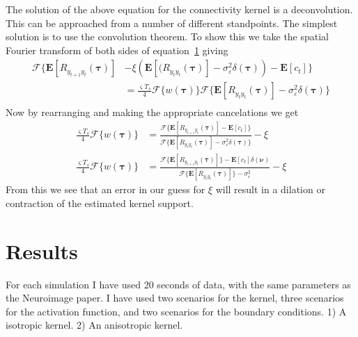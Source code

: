 \documentclass[conference]{IEEEtran}
\begin{document}
The solution of the above equation for the connectivity kernel is a deconvolution. This can be approached from a number of different standpoints. The simplest solution is to use the convolution theorem. To show this we take the spatial Fourier transform of both sides of equation~\ref{} giving
\begin{align}
	\mathcal{F}\{\mathbf{E}[R_{y_{t+1}y_t}(\boldsymbol{\tau})] &- \xi\left(\mathbf{E}[ (R_{y_ty_t}(\boldsymbol{\tau})] - \sigma_{\varepsilon}^2 \delta(\boldsymbol{\tau})\right) - \mathbf{E}\left[c_t\right]\} \nonumber \\
	&=\frac{\varsigma T_s}{4}\mathcal{F}\{w(\boldsymbol\tau)\}\mathcal{F}\{\mathbf{E}\left[R_{y_ty_t}(\boldsymbol\tau)\right] - \sigma_{\varepsilon}^2 \delta(\boldsymbol\tau)\} \\
\end{align}
Now by rearranging and making the appropriate cancelations we get
\begin{align}
	\frac{\varsigma T_s}{4}\mathcal{F}\{w(\boldsymbol\tau)\} &= \frac{\mathcal{F}\{\mathbf{E}[R_{y_{t+1}y_t}(\boldsymbol{\tau})] - \mathbf{E}\left[c_t\right]\}}{\mathcal{F}\{\mathbf{E}\left[R_{y_ty_t}(\boldsymbol\tau)\right] - \sigma_{\varepsilon}^2 \delta(\boldsymbol\tau)\}} - \xi \\
	\frac{\varsigma T_s}{4}\mathcal{F}\{w(\boldsymbol\tau)\} &= \frac{\mathcal{F}\{\mathbf{E}[R_{y_{t+1}y_t}(\boldsymbol{\tau})]\} - \mathbf{E}\left[c_t\right]\delta(\boldsymbol{\nu})}{\mathcal{F}\{\mathbf{E}\left[R_{y_ty_t}(\boldsymbol\tau)\right]\} - \sigma_{\varepsilon}^2 } - \xi 
\end{align}
From this we see that an error in our guess for $\xi$ will result in a dilation or contraction of the estimated kernel support. 



\section{Results}

For each simulation I have used 20 seconds of data, with the same parameters as the Neuroimage paper.
I have used two scenarios for the kernel, three scenarios for the activation function, and two scenarios for the boundary conditions. 1) A isotropic kernel. 2) An anisotropic kernel.
\end{document}
